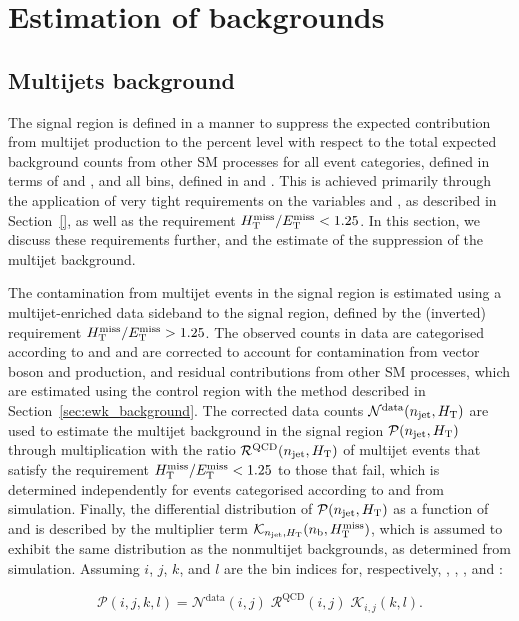 \section{Estimation of backgrounds}
\label{sec:backgrounds}

\subsection{Multijets background}
\label{sec:qcd_background}

The signal region is defined in a manner to suppress the expected
contribution from multijet production to the percent level with
respect to the total expected background counts from other SM
processes for all event categories, defined in terms of \njet and \nb,
and all bins, defined in \scalht and \HTmiss. This is achieved
primarily through the application of very tight requirements on the
variables \alphat and \dphi, as described in Section~\ref{}, as well
as the requirement $H_{\mathrm{T}}^{\text{miss}} / E_{\mathrm{T}}^{\text{miss}} < 1.25$. In this section, we discuss these
requirements further, and the estimate of the suppression of the
multijet background.

The contamination from multijet events in the signal region is
estimated using a multijet-enriched data sideband to the signal
region, defined by the (inverted) requirement $H_{\mathrm{T}}^{\text{miss}} / E_{\mathrm{T}}^{\text{miss}} > 1.25$. The
observed counts in data are categorised according to \njet and \scalht
and are corrected to account for contamination from vector boson and
\ttbar production, and residual contributions from other SM processes,
which are estimated using the \mj control region with the method
described in Section~\ref{sec:ewk_background}.  The corrected data
counts $\mathcal{N}^\text{data}(n_{\text{jet}}, H_{\mathrm{T}})$ are used to estimate
the multijet background in the signal region $\mathcal{P}(n_{\text{jet}},
H_{\mathrm{T}})$ through multiplication with the ratio
$\mathcal{R}^\text{QCD}(n_{\text{jet}}, H_{\mathrm{T}})$ of multijet events that
satisfy the requirement $H_{\mathrm{T}}^{\text{miss}} / E_{\mathrm{T}}^{\text{miss}} < 1.25$ to those that fail, which is
determined independently for events categorised according to \njet and
\scalht from simulation. Finally, the differential distribution of
$\mathcal{P}(n_{\text{jet}}, H_{\mathrm{T}})$ as a function of \nb and \HTmiss is
described by the multiplier term $\mathcal{K}_{n_{\text{jet}}, H_{\mathrm{T}}}(n_{\text{b}},
H_{\text{T}}^{\text{miss}})$, which is assumed to exhibit the same distribution as the
nonmultijet backgrounds, as determined from simulation. Assuming $i$,
$j$, $k$, and $l$ are the bin indices for, respectively, \njet,
\scalht, \nb, and \HTmiss:

\begin{equation}
  \label{eq:qcd}
  \mathcal{P}( i, j, k, l ) =
  \mathcal{N}^\text{data}( i, j )\;
  \mathcal{R}^\text{QCD}( i, j )\;
  \mathcal{K}_{i,j}( k, l ).
\end{equation}

